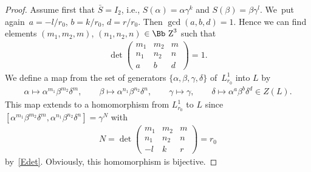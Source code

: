 \documentclass[10pt,a4paper]{amsart}
\newcommand\ZZ{{\mbox{\Bb Z}}}
\numberwithin{equation}{section}
\begin{document}
\begin{proof}
Assume first that $\bar S=I_2$, i.e., $S(\alpha)=\alpha\gamma^k$ and $S(\beta)=\beta\gamma^l$. We~put again~$a=-l/r_0$, $b=k/r_0$, $d=r/r_0$. Then $\gcd(a,b,d)=1$. Hence we can find elements $(m_1,m_2,m)$, $(n_1,n_2,n)$ $\in\ZZ^3$ such that
\begin{gather}\label{Edet}
\det \begin{pmatrix} m_1&m_2&m\\ n_1&n_2&n\\ a&b&d \end{pmatrix} =1.
\end{gather}
We define a map from the set of generators $\{\alpha,\beta,\gamma,\delta\}$ of~$L_{r_0}^1$ into $L$ by
\begin{gather*}
\alpha\longmapsto \alpha^{m_1}\beta^{m_2}\delta^m,\qquad
\beta\longmapsto \alpha^{n_1}\beta^{n_2}\delta^n,\qquad
\gamma\longmapsto\gamma,\qquad
\delta\longmapsto \alpha^a\beta^b\delta^d \in Z(L).
\end{gather*}
This map extends to a homomorphism from $L_{r_0}^1$ to $L$ since
$[\alpha^{m_1}\beta^{m_2}\delta^m,\alpha^{n_1}\beta^{n_2}\delta^n]=\gamma^N$ with
\begin{gather*}
N=\det\begin{pmatrix} m_1&m_2&m\\ n_1&n_2&n\\ -l&k&r \end{pmatrix} =r_0
\end{gather*}
by~\eqref{Edet}. Obviously, this homomorphism is bijective.


\end{proof}
\end{document}
